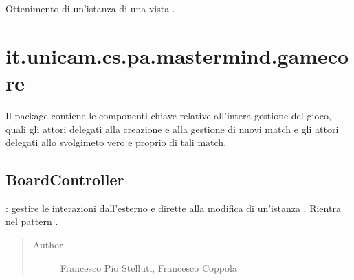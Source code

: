 \documentclass[letterpaper,10pt,italian,openany,oneside]{sphinxmanual}
\begin{document}
\begin{fulllineitems}
\label{\detokenize{source/it/unicam/cs/pa/mastermind/factories/StartViewFactory:it.unicam.cs.pa.mastermind.factories.StartViewFactory.getStartView()}}
Ottenimento di un’istanza di una vista .

\end{fulllineitems}



\section{it.unicam.cs.pa.mastermind.gamecore}
\label{\detokenize{source/it/unicam/cs/pa/mastermind/gamecore/package-index:it-unicam-cs-pa-mastermind-gamecore}}\label{\detokenize{source/it/unicam/cs/pa/mastermind/gamecore/package-index::doc}}
Il package contiene le componenti chiave relative all’intera gestione del gioco, quali gli attori delegati alla creazione e alla gestione di nuovi match e gli attori delegati allo svolgimeto vero e proprio di tali match.

\label{\detokenize{source/it/unicam/cs/pa/mastermind/gamecore/package-index:package-it.unicam.cs.pa.mastermind.gamecore}}

\subsection{BoardController}
\label{\detokenize{source/it/unicam/cs/pa/mastermind/gamecore/BoardController:boardcontroller}}\label{\detokenize{source/it/unicam/cs/pa/mastermind/gamecore/BoardController::doc}}

\begin{fulllineitems}
\label{\detokenize{source/it/unicam/cs/pa/mastermind/gamecore/BoardController:it.unicam.cs.pa.mastermind.gamecore.BoardController}}
: gestire le interazioni dall’esterno e dirette alla modifica di un’istanza . Rientra nel pattern .
\begin{quote}\begin{description}
\item[{Author}] \leavevmode
Francesco Pio Stelluti, Francesco Coppola

\end{description}\end{quote}

\end{fulllineitems}
\end{document}
